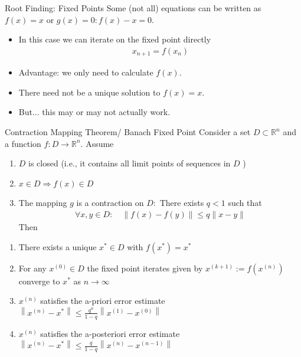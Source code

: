 \documentclass[aspectratio=169,11pt]{beamer}
\begin{document}
\begin{frame}{Root Finding: Fixed Points}
Some (not all) equations can be written as $f(x) = x$ or $g(x)=0: f(x)-x =0$.
\begin{itemize}
\item In this case we can iterate on the \alert{fixed point} directly
\begin{align*}
x_{n+1} = f(x_n)
\end{align*}
\item Advantage: we only need to calculate $f(x)$.
\item There need not be a unique solution to $f(x) = x$.
\item But... this may or may not actually work.
\end{itemize}
\end{frame}

\begin{frame}{Contraction Mapping Theorem/ Banach Fixed Point}
\small
Consider a set $D \subset \mathbb{R}^{n}$ and a function $f: D \rightarrow \mathbb{R}^{n} .$ Assume
\begin{enumerate}
\item $D$ is closed (i.e., it contains all limit points of sequences in $D$ )
\item $x \in D \Longrightarrow f(x) \in D$
\item The mapping $g$ is a contraction on $D:$ There exists $q<1$ such that
\begin{align*}
\forall x, y \in D: \quad\|f(x)-f(y)\| \leq q\|x-y\|
\end{align*}
\noindent Then \vspace{-.3cm}
\end{enumerate}
\begin{enumerate}
\item There exists a unique  $x^{*} \in D$ with $f\left(x^{*}\right)=x^{*}$
\item For any $x^{(0)} \in D$ the fixed point iterates given by $x^{(k+1)}:=f\left(x^{(n)}\right)$ converge to $x^{*}$ as $n \rightarrow \infty$
\item $x^{(n)}$ satisfies the \alert{a-priori error} estimate $\left\|x^{(n)}-x^{*}\right\| \leq \frac{q^{n}}{1-q}\left\|x^{(1)}-x^{(0)}\right\|$
\item $x^{(n)}$ satisfies the \alert{a-posteriori error} estimate $\left\|x^{(n)}-x^{*}\right\| \leq \frac{q}{1-q}\left\|x^{(n)}-x^{(n-1)}\right\|$
\end{enumerate}
\end{frame}
\end{document}
